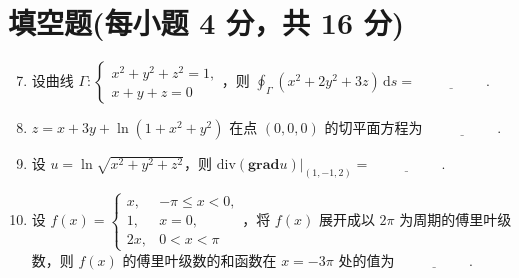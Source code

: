 \documentclass[../main.tex]{subfiles}
\begin{document}
\section{填空题(每小题 4 分，共 16 分)}
\begin{enumerate}
  \setcounter{enumi}{6}
  \item 设曲线 \( \Gamma: \begin{cases} x^2 + y^2 + z^2 = 1, \\ x + y + z = 0 \end{cases} \)，则 \( \displaystyle \oint_{\Gamma} (x^2 + 2y^2 + 3z) \,\mathrm{d}s = \underline{\hspace{5em}} \).

  \item \( z = x + 3y + \ln(1 + x^2 + y^2) \) 在点 \( (0,0,0) \) 的切平面方程为 \(\underline{\hspace{5em}}\).

  \item 设 \( u = \ln \sqrt{x^2 + y^2 + z^2} \)，则 \( \text{div}(\textbf{grad}u) \Big|_{(1,-1,2)} = \underline{\hspace{5em}} \).

  \item 设 \( f(x) = \begin{cases} x, & -\pi \leq x < 0, \\ 1, & x = 0, \\ 2x, & 0 < x < \pi \end{cases} \)，将 \( f(x) \) 展开成以 \( 2\pi \) 为周期的傅里叶级数，则 \( f(x) \) 的傅里叶级数的和函数在 \( x = -3\pi \) 处的值为 \(\underline{\hspace{5em}}\).

\end{enumerate}
\end{document}
